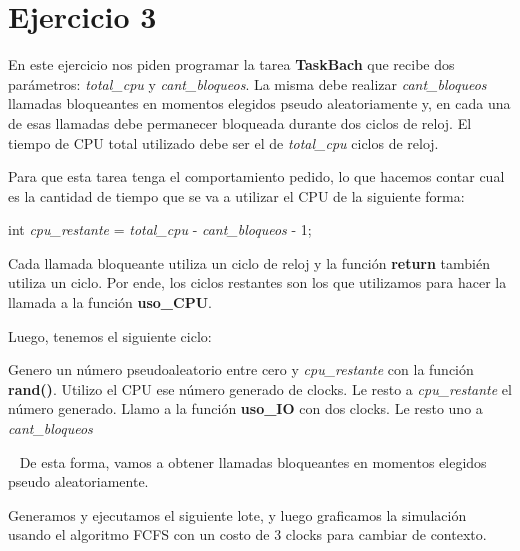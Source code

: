\section{Ejercicio 3}

En este ejercicio nos piden programar la tarea \textbf{TaskBach} que recibe dos parámetros: \textit{total\_cpu} y \textit{cant\_bloqueos}. La misma debe realizar \textit{cant\_bloqueos} llamadas bloqueantes en momentos elegidos pseudo aleatoriamente y, en cada una de esas llamadas debe permanecer bloqueada durante dos ciclos de reloj. El tiempo de CPU total utilizado debe ser el de \textit{total\_cpu} ciclos de reloj.

Para que esta tarea tenga el comportamiento pedido, lo que hacemos contar cual es la cantidad de tiempo que se va a utilizar el CPU de la siguiente forma:

\begin{center}
		int \textit{cpu\_restante} = \textit{total\_cpu} - \textit{cant\_bloqueos} - 1;
\end{center}

Cada llamada bloqueante utiliza un ciclo de reloj y la función \textbf{return} también utiliza un ciclo. Por ende, los ciclos restantes son los que utilizamos para hacer la llamada a la función \textbf{uso\_CPU}.

Luego, tenemos el siguiente ciclo:

\begin{algorithmic}

	\State Genero un número pseudoaleatorio entre cero y \textit{cpu\_restante} con la función \textbf{rand()}.
		\State Utilizo el CPU ese número generado de clocks.
	\EndIf
	\State Le resto a \textit{cpu\_restante} el número generado.
	\State Llamo a la función \textbf{uso\_IO} con dos clocks.
	\State Le resto uno a \textit{cant\_bloqueos}
\EndWhile
\end{algorithmic}
~
De esta forma, vamos a obtener llamadas bloqueantes en momentos elegidos pseudo aleatoriamente.

Generamos y ejecutamos el siguiente lote, y luego graficamos la simulación usando el algoritmo FCFS con un costo de 3 clocks para cambiar de contexto.

